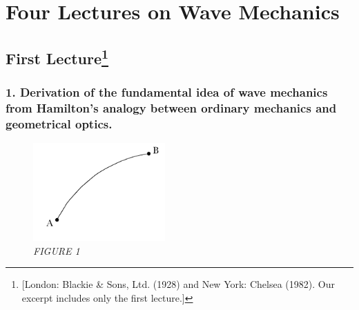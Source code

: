 \chapter{Four Lectures on Wave Mechanics}


\renewcommand{\theequation}{\arabic{equation}}

\newenvironment{rcases}
  {\left.\begin{aligned}}
  {\end{aligned}\right\rbrace} %

\section*{First Lecture\footnote{[London: Blackie \& Sons,
  Ltd. (1928) and New York: Chelsea (1982). Our excerpt includes only the first lecture.]}}

\subsection*{1. Derivation of the fundamental idea of wave mechanics from Hamilton's
analogy between ordinary mechanics and geometrical optics.}

\begin{figure}[h] %
  \begin{center}
    \includegraphics[width=1.98958in,height=1.47917in]{images/09_schroedinger/image035.png}
  \end{center}
  \caption*{\emph{FIGURE 1}}
\end{figure}

